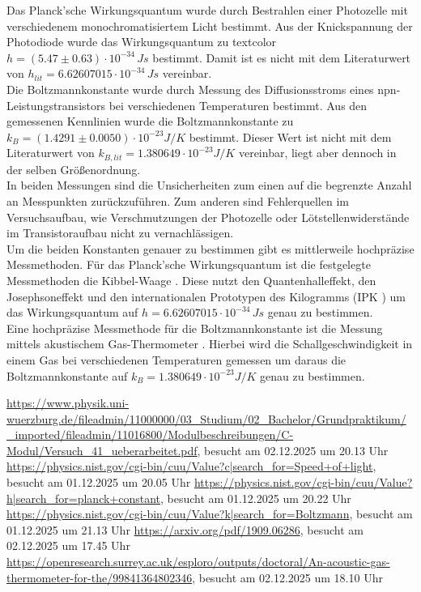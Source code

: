 \documentclass[a4paper,10pt,twocolumn]{scrartcl} %
\begin{document}
		Das Planck'sche Wirkungsquantum wurde durch Bestrahlen einer Photozelle mit verschiedenem monochromatisiertem Licht bestimmt.
		Aus der Knickspannung der Photodiode wurde das Wirkungsquantum zu textcolor{$h = (5.47 \pm 0.63)\cdot 10^{-34} \, J s$} bestimmt.
		Damit ist es nicht mit dem Literaturwert von $h_{lit} = 6.62607015 \cdot 10^{-34} \, J s$ \cite{PlanckKonstante} vereinbar. \\
		Die Boltzmannkonstante wurde durch Messung des Diffusionsstroms eines npn-Leistungstransistors bei verschiedenen Temperaturen bestimmt.
		Aus den gemessenen Kennlinien wurde die Boltzmannkonstante zu $k_B = (1.4291 \pm 0.0050) \cdot 10^{-23} J/K$ bestimmt.
		Dieser Wert ist nicht mit dem Literaturwert von $k_{B,lit} = 1.380649 \cdot 10^{-23} J/K$ \cite{BoltzmannKonstante} vereinbar, liegt
		aber dennoch in der selben Größenordnung. \\ 
		In beiden Messungen sind die Unsicherheiten zum einen auf die begrenzte Anzahl an Messpunkten zurückzuführen. 
		Zum anderen sind Fehlerquellen im Versuchsaufbau, wie Verschmutzungen der Photozelle oder Lötstellenwiderstände im Transistoraufbau nicht zu vernachlässigen. \\
		Um die beiden Konstanten genauer zu bestimmen gibt es mittlerweile hochpräzise Messmethoden. Für das Planck'sche Wirkungsquantum ist die festgelegte
		Messmethoden die Kibbel-Waage \cite{PlanckGenau}. Diese nutzt den Quantenhalleffekt, den Josephsoneffekt und den internationalen Prototypen des
		Kilogramms (IPK ) um das Wirkungsquantum auf $h = 6.62607015 \cdot 10^{-34} \, J s$ genau zu bestimmen. \\
		Eine hochpräzise Messmethode für die Boltzmannkonstante ist die Messung mittels akustischem Gas-Thermometer \cite{BoltzmannGenau}.
		Hierbei wird die Schallgeschwindigkeit in einem Gas bei verschiedenen Temperaturen gemessen um daraus die Boltzmannkonstante auf 
		$k_B = 1.380649 \cdot 10^{-23} J/K$ genau zu bestimmen. \\
	
	
\begin{thebibliography}{}    %
	\url{https://www.physik.uni-wuerzburg.de/fileadmin/11000000/03_Studium/02_Bachelor/Grundpraktikum/_imported/fileadmin/11016800/Modulbeschreibungen/C-Modul/Versuch_41_ueberarbeitet.pdf}, besucht am 02.12.2025 um 20.13 Uhr
	\url{https://physics.nist.gov/cgi-bin/cuu/Value?c|search_for=Speed+of+light}, besucht am 01.12.2025 um 20.05 Uhr
	\url{https://physics.nist.gov/cgi-bin/cuu/Value?h|search_for=planck+constant}, besucht am 01.12.2025 um 20.22 Uhr
	\url{https://physics.nist.gov/cgi-bin/cuu/Value?k|search_for=Boltzmann}, besucht am 01.12.2025 um 21.13 Uhr
	\url{https://arxiv.org/pdf/1909.06286}, besucht am 02.12.2025 um 17.45 Uhr
	\url{https://openresearch.surrey.ac.uk/esploro/outputs/doctoral/An-acoustic-gas-thermometer-for-the/99841364802346}, besucht am 02.12.2025 um 18.10 Uhr
\end{thebibliography}
\end{document}
